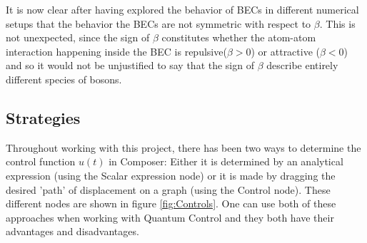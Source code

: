 \documentclass[aps,pra,reprint,superscriptaddress]{revtex4-1}
\begin{document}
It is now clear after having explored the behavior of BECs in different numerical setups that the behavior the BECs are not symmetric with respect to $\beta$. This is not unexpected, since the sign of $\beta$ constitutes whether the atom-atom interaction happening inside the BEC is repulsive($\beta>0$) or attractive ($\beta<0$) and so it would not be unjustified to say that the sign of $\beta$ describe entirely different species of bosons. 

\subsection{\label{subsec:strats}Strategies}
Throughout working with this project, there has been two ways to determine the control function $u(t)$ in Composer: Either it is determined by an analytical expression (using the Scalar expression node) or it is made by dragging the desired 'path' of displacement on a graph (using the Control node). These different nodes are shown in figure \ref{fig:Controls}. One can use both of these approaches when working with Quantum Control and they both have their advantages and disadvantages. \\
\end{document}
